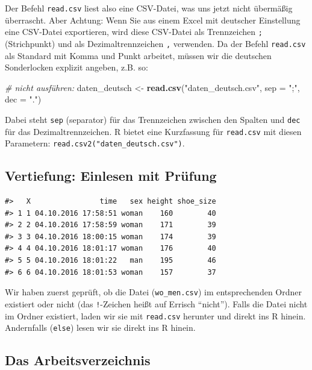 \documentclass[12pt,ngerman,]{book}
\newenvironment{Shaded}{\begin{snugshade}}{\end{snugshade}}
\newcommand{\KeywordTok}[1]{\textcolor[rgb]{0.13,0.29,0.53}{\textbf{{#1}}}}
\newcommand{\DataTypeTok}[1]{\textcolor[rgb]{0.13,0.29,0.53}{{#1}}}
\newcommand{\StringTok}[1]{\textcolor[rgb]{0.31,0.60,0.02}{{#1}}}
\newcommand{\CommentTok}[1]{\textcolor[rgb]{0.56,0.35,0.01}{\textit{{#1}}}}
\newcommand{\NormalTok}[1]{{#1}}
\renewenvironment{Shaded}{\begin{kframe}}{\end{kframe}}
\begin{document}
Der Befehl \texttt{read.csv} liest also eine CSV-Datei, was uns jetzt
nicht übermäßig überrascht. Aber Achtung: Wenn Sie aus einem Excel mit
deutscher Einstellung eine CSV-Datei exportieren, wird diese CSV-Datei
als Trennzeichen \texttt{;} (Strichpunkt) und als Dezimaltrennzeichen
\texttt{,} verwenden. Da der Befehl \texttt{read.csv} als Standard mit
Komma und Punkt arbeitet, müssen wir die deutschen Sonderlocken explizit
angeben, z.B. so:

\begin{Shaded}
\begin{Highlighting}[]
\CommentTok{# nicht ausführen:}
\NormalTok{daten_deutsch <-}\StringTok{ }\KeywordTok{read.csv}\NormalTok{(}\StringTok{"daten_deutsch.csv"}\NormalTok{, }\DataTypeTok{sep =} \StringTok{";"}\NormalTok{, }\DataTypeTok{dec =} \StringTok{"."}\NormalTok{)}
\end{Highlighting}
\end{Shaded}

Dabei steht \texttt{sep} (separator) für das Trennzeichen zwischen den
Spalten und \texttt{dec} für das Dezimaltrennzeichen. R bietet eine
Kurzfassung für \texttt{read.csv} mit diesen Parametern:
\texttt{read.csv2("daten\_deutsch.csv")}.

\subsection{Vertiefung: Einlesen mit
Prüfung}\label{vertiefung-einlesen-mit-prufung}

\begin{verbatim}
#>   X                time   sex height shoe_size
#> 1 1 04.10.2016 17:58:51 woman    160        40
#> 2 2 04.10.2016 17:58:59 woman    171        39
#> 3 3 04.10.2016 18:00:15 woman    174        39
#> 4 4 04.10.2016 18:01:17 woman    176        40
#> 5 5 04.10.2016 18:01:22   man    195        46
#> 6 6 04.10.2016 18:01:53 woman    157        37
\end{verbatim}

Wir haben zuerst geprüft, ob die Datei (\texttt{wo\_men.csv}) im
entsprechenden Ordner existiert oder nicht (das \texttt{!}-Zeichen heißt
auf Errisch ``nicht''). Falls die Datei nicht im Ordner existiert, laden
wir sie mit \texttt{read.csv} herunter und direkt ins R hinein.
Andernfalls (\texttt{else}) lesen wir sie direkt ins R hinein.

\subsection{Das Arbeitsverzeichnis}\label{das-arbeitsverzeichnis}
\end{document}
